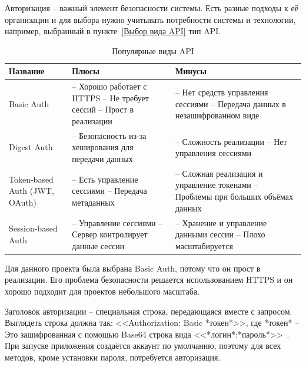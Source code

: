 \documentclass[a4paper,article]{article}
\begin{document}
\begin{sloppypar}
    Авторизация -- важный элемент безопасности системы. Есть разные подходы к её организации и для выбора нужно учитывать потребности системы и технологии, например, выбранный в пункте~\ref{Выбор вида API} тип API.

    \begin{xltabular}{\textwidth} { |
            >{\hsize} X |
            >{\hsize} X |
            >{\hsize} X | }
        \caption{\centering Популярные виды API}
        \label{tab:Авторизация} \\
            
        \hline
        Название & Плюсы & Минусы \\
        \hline
        Basic Auth
        & -- Хорошо работает с HTTPS \newline -- Не требует сессий \newline -- Прост в реализации
        & -- Нет средств управления сессиями \newline -- Передача данных в незашифрованном виде \\
        \hline
        Digest Auth
        & -- Безопасность из-за хеширования для передачи данных
        & -- Сложность реализации \newline -- Нет управления сессиями \\
        \hline
        Token-based Auth \newline (JWT, OAuth)
        & -- Есть управление сессиями \newline -- Передача метаданных
        & -- Сложная реализация и управление токенами \newline -- Проблемы при больших объёмах данных \\
        \hline
        Session-based Auth
        & -- Управление сессиями \newline -- Сервер контролирует данные сессии
        & -- Хранение и управление данными сессии \newline -- Плохо масштабируется \\
        \hline
    \end{xltabular}

    Для данного проекта была выбрана Basic Auth, потому что он прост в реализации. Его проблема безопасности решается использованием HTTPS и он хорошо подходит для проектов небольшого масштаба.

    Заголовок авторизации -- специальная строка, передающаяся вместе с запросом. Выглядеть строка должна так: <<Authorization: Basic *токен*>>, где *токен* -- Это зашифрованная с помощью Base64 строка вида <<*логин*:*пароль*>>~\cite{baeldungbook}. При запуске приложения создаётся аккаунт по умолчанию, поэтому для всех методов, кроме установки пароля, потребуется авторизация.


\end{sloppypar}
\end{document}
